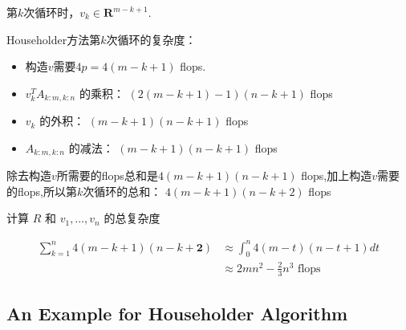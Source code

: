 第$k$次循环时，$v_k \in \mathbf{R}^{m - k + 1}$.

Householder方法第$k$次循环的复杂度：

\begin{itemize}
    \item 构造$v$需要$4p = 4(m - k + 1)$ flops.
    \item $ v_{k}^{T} A_{k: m, k: n} $ 的乘积： $ (2({m}-{k}+1)-1)({n}-{k}+1) $ flops
    \item $ v_{k} $ 的外积： $ (m-k+1)(n-k+1) $ flops
    \item $ A_{k: m, k: n} $ 的减法： $ ({m}-{k}+1)({n}-{k}+1) $ flops
\end{itemize}

除去构造$v$所需要的flops总和是$ 4({m}-{k}+1)({n}-{k}+1) $ flops,加上构造$v$需要的flops,所以第$k$次循环的总和： $ 4({m}-{k}+1)({n}-{k}+2) $ flops

\begin{theorem}
    计算 $ R $ 和 $ v_{1}, \ldots, v_{n} $ 的总复杂度

\begin{equation} \begin{aligned} \sum_{k=1}^{n} 4(m-k+1)(n-k+\boldsymbol{2}) & \approx \int_{0}^{n} 4(m-t)(n-t+1) d t \\ & \approx 2 m n^{2}-\frac{2}{3} n^{3} \text { flops } \end{aligned} \end{equation}
\end{theorem}



\subsection{An Example for Householder Algorithm}

